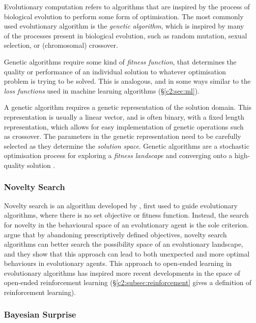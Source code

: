 Evolutionary computation refers to algorithms that are inspired by the process of biological evolution to perform some form of optimisation. 
The most commonly used evolutionary algorithm is the \textit{genetic algorithm}, which is inspired by many of the processes present in biological evolution, such as random mutation, sexual selection, or (chromosomal) crossover.

Genetic algorithms require some kind of \textit{fitness function}, that determines the quality or performance of an individual solution to whatever optimisation problem is trying to be solved. 
This is analogous, and in some ways similar to the \textit{loss functions} used in machine learning algorithms (\S \ref{c2:sec:ml}). 

A genetic algorithm requires a genetic representation of the solution domain. 
This representation is usually a linear vector, and is often binary, with a fixed length representation, which allows for easy implementation of genetic operations such as crossover. 
The parameters in the genetic representation need to be carefully selected as they determine the \textit{solution space}.
Genetic algorithms are a stochastic optimisation process for exploring a \textit{fitness landscape} and converging onto a high-quality solution \citep{back1996evolutionary}.

\subsubsection{Novelty Search}

Novelty search is an algorithm developed by \cite{lehman2008exploiting}, first used to guide evolutionary algorithms, where there is no set objective or fitness function.
Instead, the search for novelty in the behavioural space of an evolutionary agent is the sole criterion. \cite{lehman2010efficiently, lehman2011abandoning,lehman2011novelty} argue that by abandoning prescriptively defined objectives, novelty search algorithms can better search the possibility space of an evolutionary landscape, and they show that this approach can lead to both unexpected and more optimal behaviours in evolutionary agents.
This approach to open-ended learning in evolutionary algorithms has inspired more recent developments in the space of open-ended reinforcement learning \citep{wang2020enhanced} (\S \ref{c2:subsec:reinforcement} gives a definition of reinforcement learning).

\subsubsection{Bayesian Surprise}

